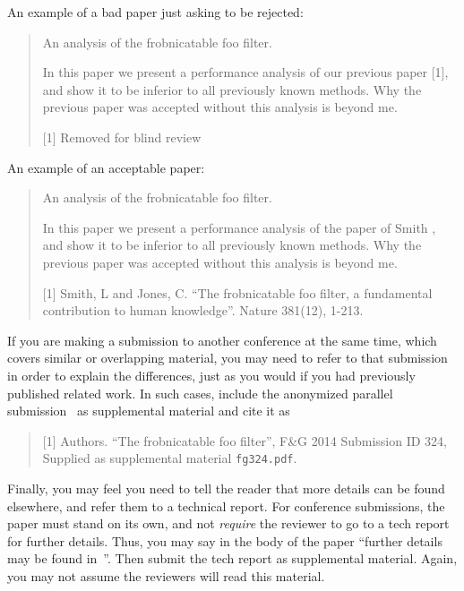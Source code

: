 \documentclass[10pt,twocolumn,letterpaper]{article}
\begin{document}
An example of a bad paper just asking to be rejected:
\begin{quote}
\begin{center}
    An analysis of the frobnicatable foo filter.
\end{center}

   In this paper we present a performance analysis of our previous paper [1], and show it to be inferior to all previously known methods.
   Why the previous paper was accepted without this analysis is beyond me.

   [1] Removed for blind review
\end{quote}


An example of an acceptable paper:
\begin{quote}
\begin{center}
     An analysis of the frobnicatable foo filter.
\end{center}

   In this paper we present a performance analysis of the  paper of Smith \etal [1], and show it to be inferior to all previously known methods.
   Why the previous paper was accepted without this analysis is beyond me.

   [1] Smith, L and Jones, C. ``The frobnicatable foo filter, a fundamental contribution to human knowledge''. Nature 381(12), 1-213.
\end{quote}

If you are making a submission to another conference at the same time, which covers similar or overlapping material, you may need to refer to that submission in order to explain the differences, just as you would if you had previously published related work.
In such cases, include the anonymized parallel submission~\cite{Authors14} as supplemental material and cite it as
\begin{quote}
[1] Authors. ``The frobnicatable foo filter'', F\&G 2014 Submission ID 324, Supplied as supplemental material {\tt fg324.pdf}.
\end{quote}

Finally, you may feel you need to tell the reader that more details can be found elsewhere, and refer them to a technical report.
For conference submissions, the paper must stand on its own, and not {\em require} the reviewer to go to a tech report for further details.
Thus, you may say in the body of the paper ``further details may be found in~\cite{Authors14b}''.
Then submit the tech report as supplemental material.
Again, you may not assume the reviewers will read this material.
\end{document}
